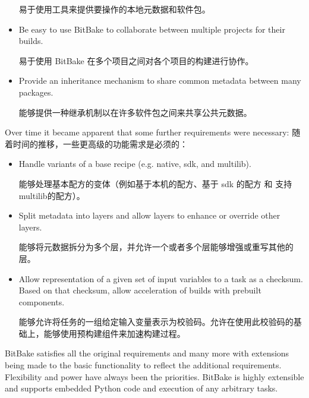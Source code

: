 \begin{itemize}
\medskip
易于使用工具来提供要操作的本地元数据和软件包。

\item Be easy to use BitBake to collaborate between multiple projects for their builds.

\medskip
易于使用 BitBake 在多个项目之间对各个项目的构建进行协作。

\item Provide an inheritance mechanism to share common metadata between many packages.

\medskip
能够提供一种继承机制以在许多软件包之间来共享公共元数据。

\end{itemize}

Over time it became apparent that some further requirements were necessary:
随着时间的推移，一些更高级的功能需求是必须的：

\begin{itemize}
\setlength\itemsep{1.0em}
    \item Handle variants of a base recipe (e.g. native, sdk, and multilib).

    \medskip
    能够处理基本配方的变体（例如基于本机的配方、基于 sdk 的配方 和 支持 multilib\footnotemark[1] 的配方）。

    \item Split metadata into layers and allow layers to enhance or override other layers.

    \medskip
    能够将元数据拆分为多个层，并允许一个或者多个层能够增强或重写其他的层。

    \item Allow representation of a given set of input variables to a task as a checksum. Based on that checksum, allow acceleration of builds with prebuilt components.

    \medskip
    能够允许将任务的一组给定输入变量表示为校验码。允许在使用此校验码的基础上，能够使用预构建组件来加速构建过程。
\end{itemize}


BitBake satisfies all the original requirements and many more with extensions being made to the basic functionality to reflect the additional requirements. Flexibility and power have always been the priorities. BitBake is highly extensible and supports embedded Python code and execution of any arbitrary tasks.


